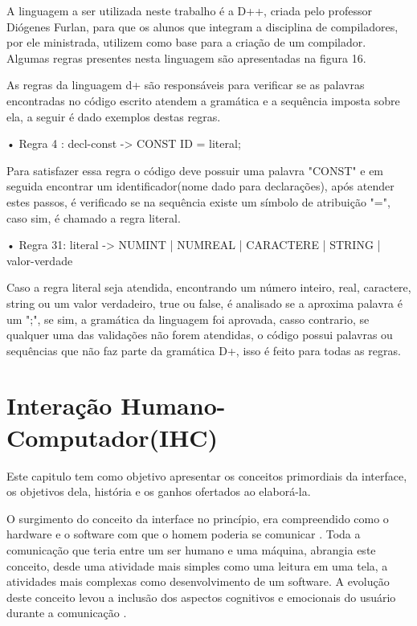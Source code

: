 \documentclass[12pt,oneside,a4paper,chapter=TITLE,section=TITLE,sumario=tradicional]{abntex2}
\begin{document}
A linguagem a ser utilizada neste trabalho é a D++, criada pelo professor Diógenes Furlan, para que os alunos que integram a disciplina de compiladores, por ele ministrada, utilizem como base para a criação de um compilador. Algumas regras presentes nesta linguagem são apresentadas na figura 16.

\begin{figure}[htb]
\end{figure}

As regras da linguagem d+ são responsáveis para verificar se as palavras encontradas no código escrito atendem a gramática e a sequência imposta sobre ela, a seguir é dado exemplos destas regras.

•	Regra 4 : decl-const -> CONST ID = literal;

Para satisfazer essa regra o código deve possuir uma palavra "CONST" e em seguida encontrar um identificador(nome dado para declarações), após atender estes passos, é verificado se na sequência existe um símbolo de atribuição "=", caso sim, é chamado a regra literal.

•	Regra 31: literal -> NUMINT | NUMREAL | CARACTERE | STRING | valor-verdade

Caso a regra literal seja atendida, encontrando um número inteiro, real, caractere, string ou um valor verdadeiro, true ou false, é analisado se a aproxima palavra é um ";", se sim, a gramática da linguagem foi aprovada, casso contrario, se qualquer uma das validações não forem atendidas, o código possui palavras ou sequências que não faz parte da gramática D+, isso é feito para todas as regras. 

\chapter{Interação Humano-Computador(IHC)}
\label{cap:interacao-humano-computador}

Este capitulo tem como objetivo apresentar os conceitos primordiais da interface, os objetivos dela, história e os ganhos ofertados ao elaborá-la. 

O surgimento do conceito da interface no princípio, era compreendido como o hardware e o software com que o homem poderia se comunicar \cite{rocha2003}.  Toda a comunicação que teria entre um ser humano e uma máquina, abrangia este conceito, desde uma atividade mais simples como uma leitura em uma tela, a atividades mais complexas como desenvolvimento de um software. A evolução deste conceito levou a inclusão dos aspectos cognitivos e emocionais do usuário durante a comunicação \cite{rocha2003}.
\end{document}
